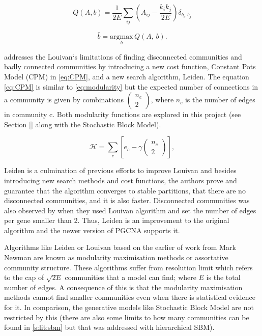 \begin{equation} \label{eq:mod_max_cost}
    Q(A,b) = \frac{1}{2E} \sum_{ij} \left( A_{ij} - \frac{k_i k_j}{2E} \right) \delta_{b_i, b_j}
\end{equation}

\begin{equation} \label{eq:mod_max_per_com}
    \bar{b} = \underset{b}{\mathrm{argmax}} \, Q(A, \, b).
\end{equation}

\citet{Traag2019-ne} addresses the Louivan`s limitations of finding disconnected communities and badly connected communities by introducing a new cost function, Constant Pots Model (CPM) in \cref{eq:CPM}, and a new search algorithm, Leiden. The equation \cref{eq:CPM} is similar to \cref{eq:modularity} but the expected number of connections in a community is given by combinations $(\begin{array}{c}{n}_{c}\\ 2\end{array})$, where $n_c$ is the number of edges in community c. Both modularity functions are explored in this project (see Section \ref{} along with the Stochastic Block Model).

\begin{equation} \label{eq:CPM}
    {\mathcal H} ={\sum }_{c}[{e}_{c}-\gamma (\begin{array}{c}{n}_{c}\\ 2\end{array})],
\end{equation}

Leiden is a culmination of previous efforts to improve Louivan\cite{Ozaki2016-dl,Waltman2013-zw,Bae2017-rz, Traag2015-tq} and besides introducing new search methods and cost functions, the authors prove and guarantee that the algorithm converges to stable partitions, that there are no disconnected communities, and it is also faster. Disconnected communities was also observed by \citet{Care2019-ij} when they used Louivan algorithm and set the number of edges per gene smaller than 2. Thus, Leiden is an improvement to the original algorithm and the newer version of PGCNA \cite{Care2019-ij} supports it.

Algorithms like Leiden or Louivan based on the earlier of work from Mark Newman \cite{Newman2004-dd, Newman2006-fa} are known as modularity maximisation methods or assortative community structure. These algorithms suffer from resolution limit\cite{Fortunato2007-gh, Peixoto2021-jx} which refers to the cap of $\sqrt{2E}$ communities that a model can find; where $E$ is the total number of edges. A consequence of this is that the modularity maximisation methods cannot find smaller communities even when there is statistical evidence for it. In comparison, the generative models like Stochastic Block Model are not restricted by this (there are also some limits to how many communities can be found in \cref{s:lit:sbm} but that was addressed with hierarchical SBM).


